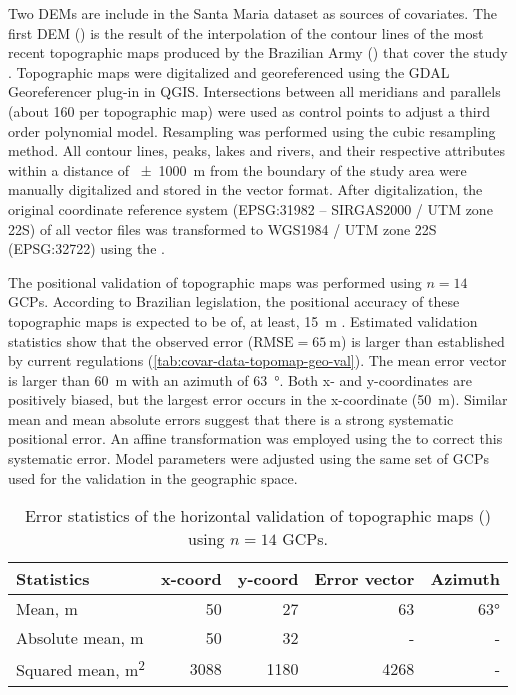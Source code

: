 Two DEMs are include in the Santa Maria dataset as sources of covariates. The first DEM (\demNew{}) is the 
result of the interpolation of the contour lines of the most recent topographic maps produced by the Brazilian 
Army () that cover the study \cite{DSG1980, DSG1992, DSG1992a}. Topographic maps were digitalized
and georeferenced using the GDAL Georeferencer plug-in in QGIS. Intersections between all meridians and 
parallels (about \num{160} per topographic map) were used as control points to adjust a third order polynomial 
model. Resampling was performed using the cubic resampling method. All contour lines, peaks, lakes and rivers, 
and their respective attributes within a distance of \SI{\pm1000}{\metre} from the boundary of the study area 
were manually digitalized and stored in the vector format. After digitalization, the original coordinate 
reference system (EPSG:31982 -- SIRGAS2000 / UTM zone 22S) of all vector files was transformed to WGS1984 / 
UTM zone 22S (EPSG:32722) using the  \cite{BivandEtAl2013a}.

The positional validation of topographic maps was performed using $n = 14$ GCPs. According to Brazilian 
legislation, the positional accuracy of these topographic maps is expected to be of, at least, \SI{15}{\metre} 
\cite{Brasil1984}. Estimated validation statistics show that the observed error ($\text{RMSE} = \SI{65}{\m}$) 
is larger than established by current regulations (\autoref{tab:covar-data-topomap-geo-val}). The mean error 
vector is larger than \SI{60}{\metre} with an azimuth of \SI{63}{\degree}. Both x- and y-coordinates are 
positively biased, but the largest error occurs in the x-coordinate (\SI{50}{\metre}). Similar mean and mean 
absolute errors suggest that there is a strong systematic positional error. An affine transformation was 
employed using the  \cite{Carrillo2012} to correct this systematic error. Model 
parameters were adjusted using the same set of GCPs used for the validation in the geographic space.

\begin{table}[ht]
 \caption{Error statistics of the horizontal validation of topographic maps () using $n = 14$ 
 GCPs.}
 \label{tab:tab:covar-data-topomap-geo-val}
 \centering
 {\small
 \begin{tabular}{lrrrr}
  \hline
  Statistics                    & x-coord & y-coord & Error vector & Azimuth  \\
  \hline
  Mean, \si{\m}                 & 50      & 27      & 63           & \ang{63} \\ 
  Absolute mean, \si{\m}        & 50      & 32      & -            & -        \\ 
  Squared mean, \si{\m\squared} & 3088    & 1180    & 4268         & -        \\ 
  \hline
 \end{tabular}}
\end{table}

